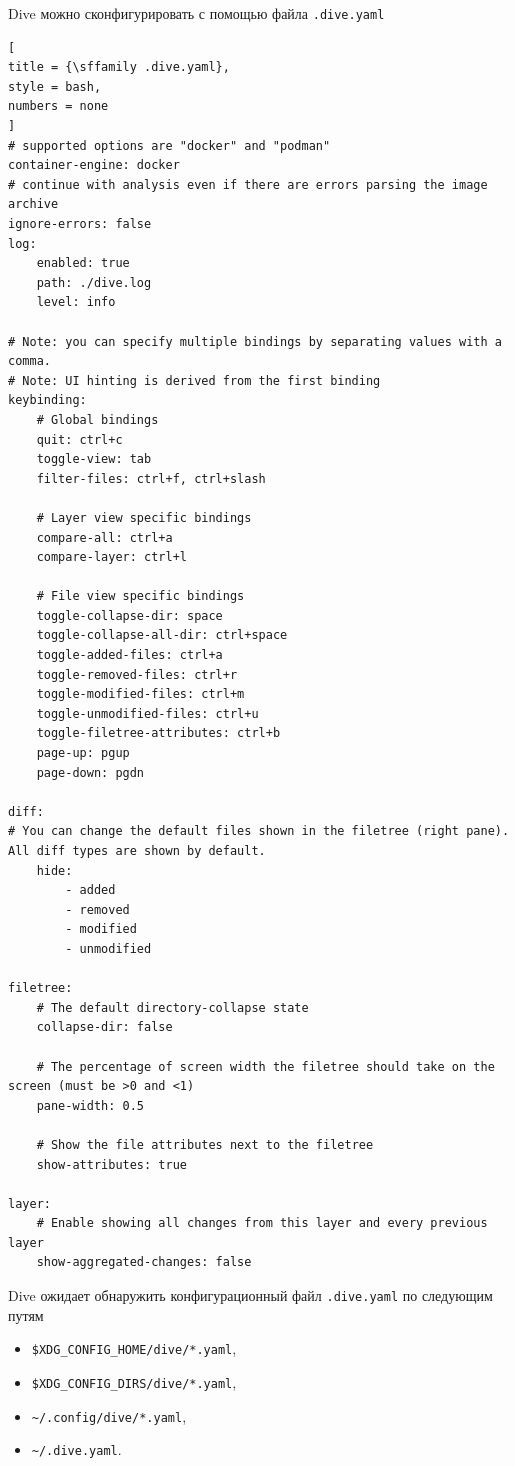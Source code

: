 \documentclass[%
	11pt,
	a4paper,
	utf8,
		]{article}
\begin{document}
Dive можно сконфигурировать с помощью файла \texttt{.dive.yaml}
\begin{lstlisting}[
title = {\sffamily .dive.yaml},
style = bash,
numbers = none	
]
# supported options are "docker" and "podman"
container-engine: docker
# continue with analysis even if there are errors parsing the image archive
ignore-errors: false
log:
	enabled: true
	path: ./dive.log
	level: info

# Note: you can specify multiple bindings by separating values with a comma.
# Note: UI hinting is derived from the first binding
keybinding:
	# Global bindings
	quit: ctrl+c
	toggle-view: tab
	filter-files: ctrl+f, ctrl+slash
	
	# Layer view specific bindings
	compare-all: ctrl+a
	compare-layer: ctrl+l

	# File view specific bindings
	toggle-collapse-dir: space
	toggle-collapse-all-dir: ctrl+space
	toggle-added-files: ctrl+a
	toggle-removed-files: ctrl+r
	toggle-modified-files: ctrl+m
	toggle-unmodified-files: ctrl+u
	toggle-filetree-attributes: ctrl+b
	page-up: pgup
	page-down: pgdn

diff:
# You can change the default files shown in the filetree (right pane). All diff types are shown by default.
	hide:
		- added
		- removed
		- modified
		- unmodified

filetree:
	# The default directory-collapse state
	collapse-dir: false

	# The percentage of screen width the filetree should take on the screen (must be >0 and <1)
	pane-width: 0.5

	# Show the file attributes next to the filetree
	show-attributes: true

layer:
	# Enable showing all changes from this layer and every previous layer
	show-aggregated-changes: false
\end{lstlisting}

Dive ожидает обнаружить конфигурационный файл \texttt{.dive.yaml} по следующим путям
\begin{itemize}
	\item \verb|$XDG_CONFIG_HOME/dive/*.yaml|,
	
	\item \verb|$XDG_CONFIG_DIRS/dive/*.yaml|,
	
	\item \verb|~/.config/dive/*.yaml|,
	
	\item \verb|~/.dive.yaml|.
\end{itemize}
\end{document}
